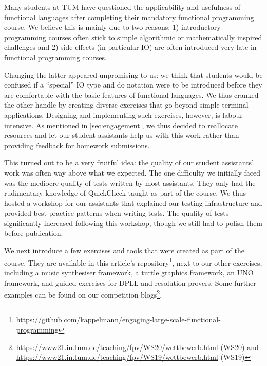 Many students at TUM have questioned the
applicability and usefulness
of functional languages after completing
their mandatory functional programming course.
We believe this is mainly due to two reasons:
1) introductory programming courses often stick
to simple algorithmic or mathematically inspired challenges and
2) side-effects (in particular IO)
are often introduced very late
in functional programming courses.

Changing the latter appeared unpromising to us:
we think that students would be confused
if a ``special'' IO type and do notation were to
be introduced before they are comfortable
with the basic features of functional
languages.
We thus cranked the other handle
by creating diverse exercises that go beyond
simple terminal applications.
Designing and implementing such exercises,
however, is labour-intensive.
As mentioned in \cref{sec:engagement},
we thus decided to reallocate resources and
let our student assistants help us with this work
rather than providing feedback for homework submissions.

This turned out to be a very fruitful idea:
the quality of our student assistants' work was often way above what
we expected.
The one difficulty we initially faced was the mediocre quality of
tests written by most assistants.
They only had the rudimentary knowledge of QuickCheck taught as part of
the course.
We thus hosted a workshop for our assistants that explained
our testing infrastructure and provided best-practice
patterns when writing tests.
The quality of tests significantly increased following this workshop,
though we still had to polish them before publication.

We next introduce a few exercises and tools
that were created as part of the course.
They are available in this article's repository\footnote{\url{https://github.com/kappelmann/engaging-large-scale-functional-programming}},
next to our other exercises, including
a music synthesiser framework,
a turtle graphics framework,
an UNO framework,
and guided exercises for DPLL and resolution provers.
Some further examples can be found on our competition blogs\footnote{\url{https://www21.in.tum.de/teaching/fpv/WS20/wettbewerb.html} (WS20) and
\url{https://www21.in.tum.de/teaching/fpv/WS19/wettbewerb.html} (WS19)}.


